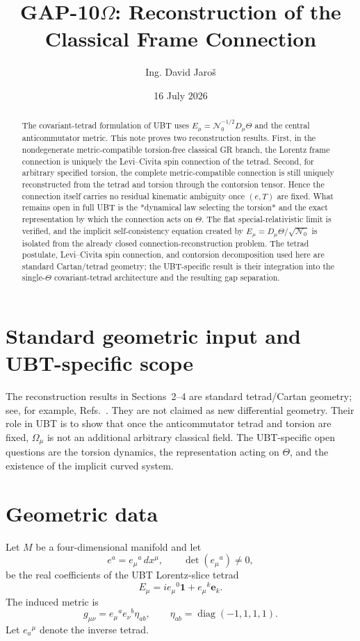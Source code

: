 \documentclass[12pt,a4paper]{article}
\title{GAP-10$\Omega$: Reconstruction of the Classical Frame Connection}
\author{Ing. David Jaro\v{s}}
\date{16 July 2026}
\theoremstyle{remark}\newtheorem{remark}[definition]{Remark}
\begin{document}
\maketitle
\UBTProvenanceNotice

\begin{abstract}
The covariant-tetrad formulation of UBT uses
$E_\mu=\mathcal N_0^{-1/2}D_\mu\Theta$ and the central anticommutator metric.
This note proves two reconstruction results.  First, in the nondegenerate
metric-compatible torsion-free classical GR branch, the Lorentz frame
connection is uniquely the Levi--Civita spin connection of the tetrad.  Second,
for arbitrary specified torsion, the complete metric-compatible connection is
still uniquely reconstructed from the tetrad and torsion through the
contorsion tensor.  Hence the connection itself carries no residual kinematic
ambiguity once $(e,T)$ are fixed.  What remains open in full UBT is the
*dynamical law selecting the torsion* and the exact representation by which the
connection acts on $\Theta$.  The flat special-relativistic limit is verified,
and the implicit self-consistency equation created by
$E_\mu=D_\mu\Theta/\sqrt{\mathcal N_0}$ is isolated from the already closed
connection-reconstruction problem.  The tetrad postulate, Levi--Civita
spin connection, and contorsion decomposition used here are standard
Cartan/tetrad geometry; the UBT-specific result is their integration into
the single-$\Theta$ covariant-tetrad architecture and the resulting gap
separation.
\end{abstract}

\section{Standard geometric input and UBT-specific scope}
The reconstruction results in Sections~2--4 are standard tetrad/Cartan
geometry; see, for example, Refs.~\cite{wald1984,hehl1976}.  They are not
claimed as new differential geometry.  Their role in UBT is to show that
once the anticommutator tetrad and torsion are fixed, $\Omega_\mu$ is not
an additional arbitrary classical field.  The UBT-specific open questions
are the torsion dynamics, the representation acting on $\Theta$, and the
existence of the implicit curved system.

\section{Geometric data}
Let $M$ be a four-dimensional manifold and let
\begin{equation}
 e^a=e_\mu{}^a\,dx^\mu,
 \qquad \det(e_\mu{}^a)\ne0,
 \label{eq:coframe}
\end{equation}
be the real coefficients of the UBT Lorentz-slice tetrad
\begin{equation}
 E_\mu=i e_\mu{}^0\mathbf 1+e_\mu{}^k\mathbf e_k.
\end{equation}
The induced metric is
\begin{equation}
 g_{\mu\nu}=e_\mu{}^a e_\nu{}^b\eta_{ab},
 \qquad \eta_{ab}=\operatorname{diag}(-1,1,1,1).
 \label{eq:metric}
\end{equation}
Let $e_a{}^\mu$ denote the inverse tetrad.
\end{document}
